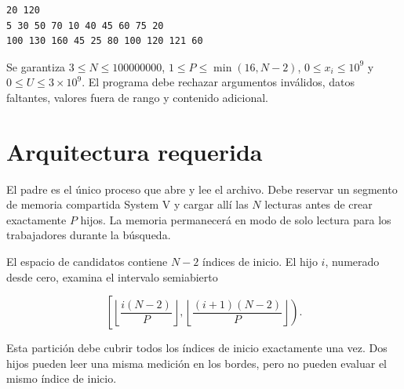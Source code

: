 \documentclass[12pt,a4paper]{article}
\begin{document}
\begin{lstlisting}[language={}, numbers=none]
20 120
5 30 50 70 10 40 45 60 75 20
100 130 160 45 25 80 100 120 121 60
\end{lstlisting}

Se garantiza $3 \leq N \leq 100000000$, $1 \leq P \leq \min(16,N-2)$, $0 \leq x_i \leq 10^9$ y $0 \leq U \leq 3\times10^9$. El programa debe rechazar argumentos inválidos, datos faltantes, valores fuera de rango y contenido adicional.

\section*{Arquitectura requerida}
El padre es el único proceso que abre y lee el archivo. Debe reservar un segmento de memoria compartida System V y cargar allí las $N$ lecturas antes de crear exactamente $P$ hijos. La memoria permanecerá en modo de solo lectura para los trabajadores durante la búsqueda.

El espacio de candidatos contiene $N-2$ índices de inicio. El hijo $i$, numerado desde cero, examina el intervalo semiabierto

\begin{equation*}
    \left[\left\lfloor\frac{i(N-2)}{P}\right\rfloor,
    \left\lfloor\frac{(i+1)(N-2)}{P}\right\rfloor\right).
\end{equation*}

Esta partición debe cubrir todos los índices de inicio exactamente una vez. Dos hijos pueden leer una misma medición en los bordes, pero no pueden evaluar el mismo índice de inicio.
\end{document}
